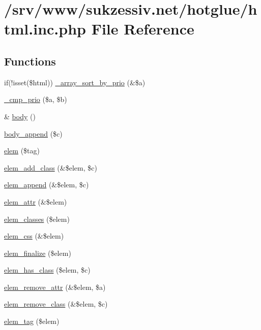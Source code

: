 \hypertarget{html_8inc_8php}{
\section{/srv/www/sukzessiv.net/hotglue/html.inc.php File Reference}
\label{html_8inc_8php}
}
\subsection*{Functions}
\begin{CompactItemize}
\item 
if(!isset(\$html)) \hyperlink{html_8inc_8php_7fb2b386b2bae219112628971275c225}{\_\-array\_\-sort\_\-by\_\-prio} (\&\$a)
\item 
\hyperlink{html_8inc_8php_f8ecadff0a4b78867d4da5eae49615e1}{\_\-cmp\_\-prio} (\$a, \$b)
\item 
\& \hyperlink{html_8inc_8php_8b842636055e9a5853a7a10a9e002330}{body} ()
\item 
\hyperlink{html_8inc_8php_d27881abf3a2004d287434d8c8d7cdf6}{body\_\-append} (\$c)
\item 
\hyperlink{html_8inc_8php_a7a1256f84f937f1656195d5ce7b8d91}{elem} (\$tag)
\item 
\hyperlink{html_8inc_8php_afa12d2b690751666e599fb052e19ca6}{elem\_\-add\_\-class} (\&\$elem, \$c)
\item 
\hyperlink{html_8inc_8php_ea37c451f5d55e2efbb2656e340c1dae}{elem\_\-append} (\&\$elem, \$c)
\item 
\hyperlink{html_8inc_8php_894dc22f3b7668c59364599909162b8e}{elem\_\-attr} (\&\$elem)
\item 
\hyperlink{html_8inc_8php_821651b8923938645b0b0fa6bb084522}{elem\_\-classes} (\$elem)
\item 
\hyperlink{html_8inc_8php_c705ef06deb9e2d49e342ed78ecc1c9a}{elem\_\-css} (\&\$elem)
\item 
\hyperlink{html_8inc_8php_f04b43a4dd09e73ca2cef84a4f2e9381}{elem\_\-finalize} (\$elem)
\item 
\hyperlink{html_8inc_8php_b1019c4b75181c1c1af10e1c1e5e197d}{elem\_\-has\_\-class} (\$elem, \$c)
\item 
\hyperlink{html_8inc_8php_eb7074172d9164f69e64967b6bcdc643}{elem\_\-remove\_\-attr} (\&\$elem, \$a)
\item 
\hyperlink{html_8inc_8php_6a224914e8f32176ca11a31154b1ae13}{elem\_\-remove\_\-class} (\&\$elem, \$c)
\item 
\hyperlink{html_8inc_8php_158c5e6dccf734bc8c035e6bcd0a446f}{elem\_\-tag} (\$elem)

\end{CompactItemize}
